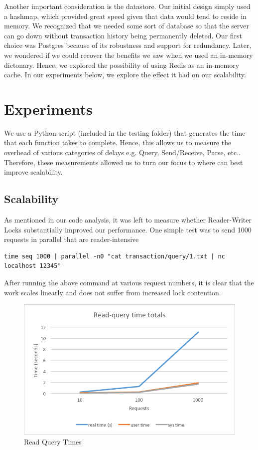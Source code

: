 \documentclass[titlepage, 11pt]{article}
\newcommand\0{\mathbf{0}}
\newcommand\<{\langle}
\renewcommand\>{\rangle}
\begin{document}
Another important consideration is the datastore. Our initial design simply used a hashmap, which provided great speed given that data would tend to reside in memory. We recognized that we needed some sort of database so that the server can go down without transaction history being permanently deleted. Our first choice was Postgres because of its robustness and support for redundancy. Later, we wondered if we could recover the benefits we saw when we used an in-memory dictonary. Hence, we explored the possibility of using Redis as an in-memory cache. In our experiments below, we explore the effect it had on our scalability.

\section{Experiments}


We use a Python script (included in the testing folder) that generates the time that each function takes to complete. Hence, this allows us to measure the overhead of various categories of delays e.g. Query, Send/Receive, Parse, etc.. Therefore, these measurements allowed us to turn our focus to where can best improve scalability.

\subsection{Scalability}

As mentioned in our code analysis, it was left to measure whether Reader-Writer Locks substantially improved our performance. One simple test was to send 1000 requests in parallel that are reader-intensive

\begin{lstlisting}
time seq 1000 | parallel -n0 "cat transaction/query/1.txt | nc localhost 12345"
\end{lstlisting}

After running the above command at various request numbers, it is clear that the work scales linearly and does not suffer from increased lock contention.

\begin{figure}[H]
\centering
\includegraphics[width=\linewidth]{read-query-times.png}
\caption{Read Query Times}
\end{figure}
\end{document}
